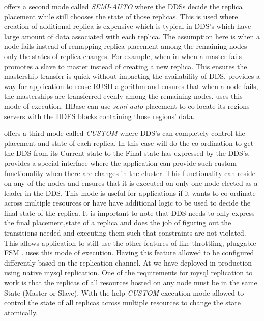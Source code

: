 \helix offers a second mode called \emph{SEMI-AUTO} where the DDSs decide the replica placement while \helix still chooses 
the state of those replicas. This is used where creation of additional replica is expensive which is typical in DDS's which have
 large amount of data associated with each replica. The assumption here is when a node fails instead of remapping replica placement 
 among the remaining nodes only the states of replica changes. For example, when
 in \ES when a master fails \helix promotes a slave to master instead of
 creating a new replica. This ensures the mastership transfer is quick without impacting the availability of DDS. \helix provides a way for application to reuse RUSH algorithm and
  ensures that when a node fails, the masterships are transferred evenly among
  the remaining nodes. \ES uses this mode of execution. HBase can use \emph{semi-auto} placement to co-locate its regions servers with the HDFS blocks
containing those regions' data.

\helix offers a third mode called \emph{CUSTOM} where DDS's can completely control the placement and state of each replica. In this 
case \helix will do the co-ordination to get the DDS from its Current state to the Final state has expressed by the DDS's. 
\helix provides a special interface where the application can provide such
custom functionality when there are changes in the cluster.
This functionality can reside on any of the nodes and \helix ensures that it is
executed on only one node elected as a leader in the DDS. This mode is useful
for applications if it wants to co-ordinate across multiple resources or have have additional logic to
be used to decide the final state of the replica. It is important to note that DDS needs to only express the final placement,state of a replica and \helix does the job of figuring out
 the transitions needed and executing them such that constraints are not violated. This allows 
application to still use the other features of \helix like throttling, pluggable FSM \etc. \seas uses this mode of execution. 
Having this feature allowed \ES to be configured differently based on the
replication channel. At \linkedin we have deployed \ES in production using
native mysql replication. One of the requirements for mysql replication to work
is that the replicas of all resources hosted on any node must be in the
same State (Master or Slave).
With the help \emph{CUSTOM} execution mode \helix allowed \ES to control the state of all replicas across multiple resources to change the state atomically.

